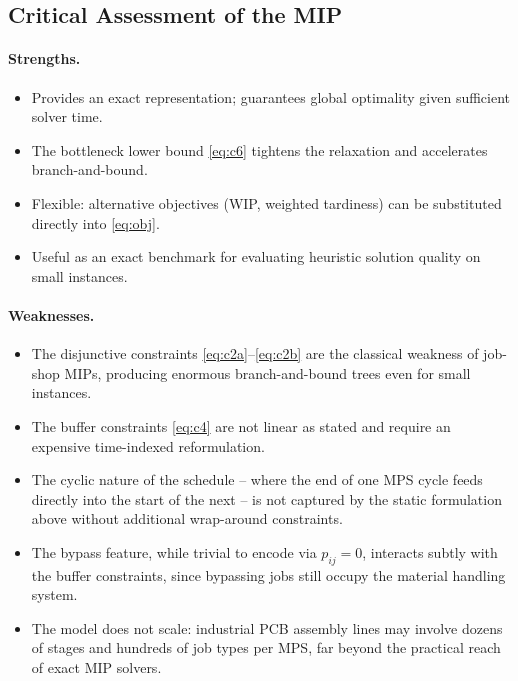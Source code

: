 \documentclass[11pt,a4paper]{article}
\begin{document}
\subsection{Critical Assessment of the MIP}

\paragraph{Strengths.}
\begin{itemize}
  \item Provides an exact representation; guarantees global optimality
    given sufficient solver time.
  \item The bottleneck lower bound \eqref{eq:c6} tightens the relaxation
    and accelerates branch-and-bound.
  \item Flexible: alternative objectives (WIP, weighted tardiness) can be
    substituted directly into \eqref{eq:obj}.
  \item Useful as an exact benchmark for evaluating heuristic solution
    quality on small instances.
\end{itemize}

\paragraph{Weaknesses.}
\begin{itemize}
  \item The disjunctive constraints \eqref{eq:c2a}--\eqref{eq:c2b} are the
    classical weakness of job-shop MIPs, producing enormous branch-and-bound
    trees even for small instances.
  \item The buffer constraints \eqref{eq:c4} are not linear as stated and
    require an expensive time-indexed reformulation.
  \item The cyclic nature of the schedule -- where the end of one MPS
    cycle feeds directly into the start of the next -- is not captured by
    the static formulation above without additional wrap-around
    constraints.
  \item The bypass feature, while trivial to encode via $p_{ij}=0$,
    interacts subtly with the buffer constraints, since bypassing jobs
    still occupy the material handling system.
  \item The model does not scale: industrial PCB assembly lines may involve
    dozens of stages and hundreds of job types per MPS, far beyond the
    practical reach of exact MIP solvers.
\end{itemize}
\end{document}
